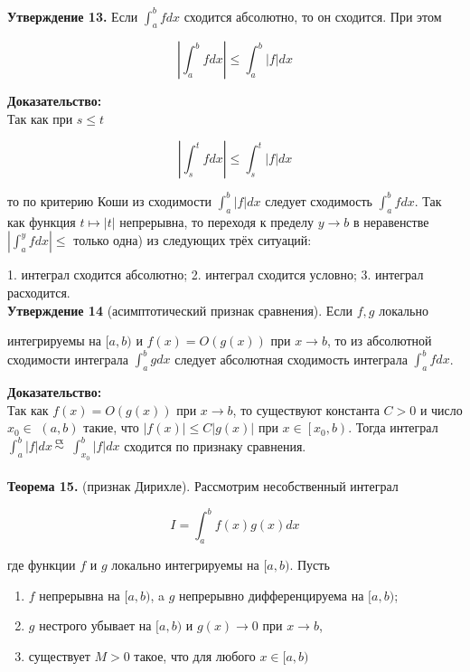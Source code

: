 \documentclass[a4paper,12pt]{article} %
\begin{document}
	\textbf{Утверждение 13.} Если $\int_{a}^{b} f d x$ сходится абсолютно, то он сходится. При этом
	
	$$
	\left|\int_{a}^{b} f d x\right| \leq \int_{a}^{b}|f| d x
	$$
	
	\textbf{Доказательство:\\}
	Так как при $s \leq t$
	
	$$
	\left|\int_{s}^{t} f d x\right| \leq \int_{s}^{t}|f| d x
	$$
	
	то по критерию Коши из сходимости $\int_{a}^{b}|f| d x$ следует сходимость $\int_{a}^{b} f d x$. Так как функция $t \mapsto|t|$ непрерывна, то переходя к пределу $y \rightarrow b$ в неравенстве $\left|\int_{a}^{y} f d x\right| \leq$
	только одна) из следующих трёх ситуаций:
	
	1. интеграл сходится абсолютно;
	2. интеграл сходится условно;
	3. интеграл расходится.\\

	\textbf{Утверждение 14} (асимптотический признак сравнения). Если $f, g$ локально
	
	интегрируемы на $[a, b)$ и $f(x)=O(g(x))$ при $x \rightarrow b$, то из абсолютной сходимости интеграла $\int_{a}^{b} g d x$ следует абсолютная сходимость интеграла $\int_{a}^{b} f d x$.
	
	\textbf{Доказательство:\\}
	Так как $f(x)=O(g(x))$ при $x \rightarrow b$, то существуют константа $C>0$ и число $x_{0} \in$ $(a, b)$ такие, что $|f(x)| \leq C|g(x)|$ при $x \in\left[x_{0}, b\right)$. Тогда интеграл $\int_{a}^{b}|f| d x \stackrel{\text { сх }}{\sim}$ $\int_{x_{0}}^{b}|f| d x$ сходится по признаку сравнения.
	\\
	\\
	\textbf{Теорема 15.} (признак Дирихле). Рассмотрим несобственный интеграл
	
	$$
	I=\int_{a}^{b} f(x) g(x) d x
	$$
	
	где функции $f$ и $g$ локально интегрируемы на $[a, b)$. Пусть
	
	\begin{enumerate}
		\item $f$ непрерывна на $[a, b)$, a $g$ непрерывно дифференцируема на $[a, b)$;
	
		\item $g$ нестрого убывает на $[a, b)$ и $g(x) \rightarrow 0$ при $x \rightarrow b$,
	
		\item существует $M>0$ такое, что для любого $x \in[a, b)$
	
	\end{enumerate}
	
\end{document}
